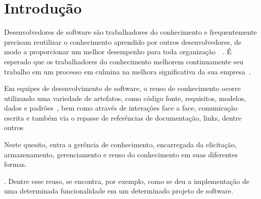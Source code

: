 \chapter{Introdução}

Desenvolvedores de software são trabalhadores do conhecimento e frequentemente precisam reutilizar o conhecimento aprendido por outros desenvolvedores, de modo a proporcionar um melhor desempenho para toda organização~\cite{Druker1993}~\cite{Wiig2003}.
É esperado que os trabalhadores do conhecimento melhorem  continuamente seu trabalho em um processo em culmina na melhora significativa da sua empresa~\cite{Kavitha2011}.


Em equipes de desenvolvimento de software, o reuso de conhecimento ocorre utilizando uma variedade de artefatos, como código fonte, requisitos, modelos, dados e padrões~\cite{Levy2009}, bem como através de interações face a face, comunicação escrita e também via o repasse de referências de documentação, links, dentre outros~\cite{Storey2014}~\cite{Olson2000}~\cite{CubraniC2004}

Neste quesito, entra a gerência de conhecimento, encarregada da elicitação, armazenamento, gerenciamento e reuso do conhecimento em suas diferentes formas.
.
Dentre esse reuso, se encontra, por exemplo, como se deu a implementação de uma determinada funcionalidade em um determinado projeto de software.



